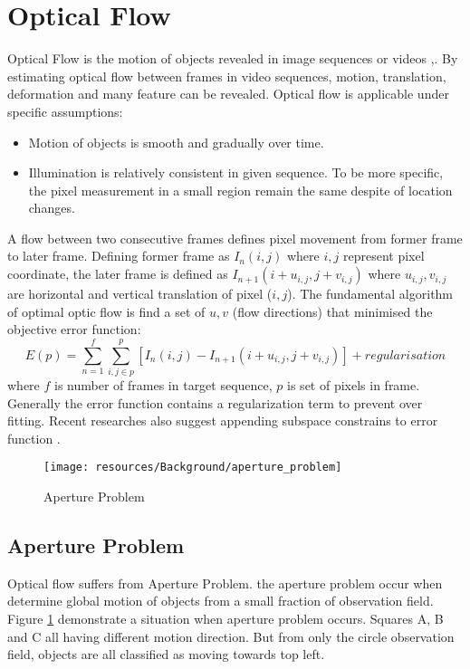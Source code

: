 \section{Optical Flow}
\label{sec:bg_opticalflow}
Optical Flow is the motion of objects revealed in image sequences or videos \cite{fleet2006optical},\cite{Sun2010}. By estimating optical flow between frames in video sequences, motion, translation, deformation and many feature can be revealed. Optical flow is applicable under specific assumptions:
\begin{itemize}
  \item Motion of objects is smooth and gradually over time.
  \item Illumination is relatively consistent in given sequence. To be more specific, the pixel measurement in a small region remain the same despite of location changes.
\end{itemize}
A flow between two consecutive frames defines pixel movement from former frame to later frame. Defining former frame as \(I_n(i,j)\) where \(i,j\) represent pixel coordinate, the later frame is defined as \(I_{n+1}(i+u_{i,j},j+v_{i,j})\) where \(u_{i,j},v_{i,j}\) are horizontal and vertical translation of pixel (\(i,j\)). The fundamental algorithm of optimal optic flow is find a set of $u, v$ (flow directions) that minimised the objective error function:
\begin{equation}
E(p)=\sum^f_{n=1}\sum^{p}_{i,j\in p}[I_n(i,j)-I_{n+1}(i+u_{i,j},j+v_{i,j})]+regularisation
\end{equation}
where $f$ is number of frames in target sequence, $p$ is set of pixels in frame. Generally the error function contains a regularization term to prevent over fitting. Recent researches also suggest appending subspace constrains to error function \cite{Garg2013, Garg, Garg2013a}. 

\begin{figure}[h]
\centering
\texttt{[image: resources/Background/aperture\_problem]}
\caption{Aperture Problem}
\label{fig:aperture_problem}
\end{figure}

\subsection{Aperture Problem}

Optical flow suffers from Aperture Problem. the aperture problem occur when determine global motion of objects from a small fraction of observation field. Figure \ref{fig:aperture_problem} demonstrate a situation when aperture problem occurs. Squares A, B and C all having different motion direction. But from only the circle observation field, objects are all classified as moving towards top left.

